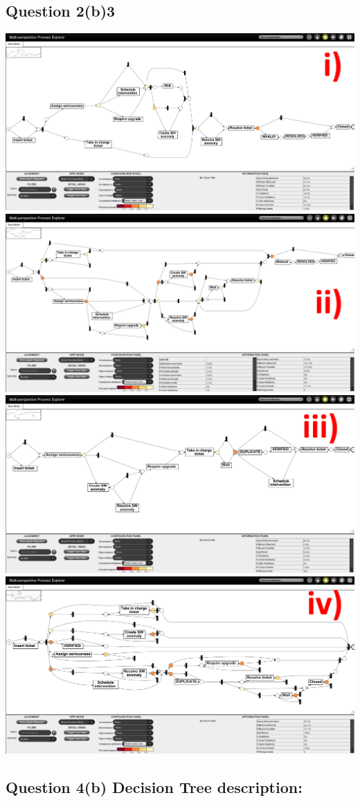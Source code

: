 \documentclass[12pt]{article}
\begin{document}
\subsection*{Question 2(b)3}
\includegraphics[width=\columnwidth]{Question_2/img/ProM_b_inductive_PRE_i.png}\\
\includegraphics[width=\columnwidth]{Question_2/img/ProM_b_inductive_PRE_ii.png}\\
\includegraphics[width=\columnwidth]{Question_2/img/ProM_b_inductive_POST_iii.png}\\
\includegraphics[width=\columnwidth]{Question_2/img/ProM_b_inductive_POST_iv.png}\\
\subsection*{Question 4(b) Decision Tree description:}

\end{document}
